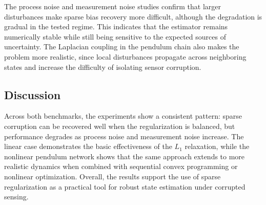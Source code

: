 \documentclass[conference]{IEEEtran}
\begin{document}

The process noise and measurement noise studies confirm that larger disturbances make sparse bias recovery more difficult, although the degradation is gradual in the tested regime. This indicates that the estimator remains numerically stable while still being sensitive to the expected sources of uncertainty. The Laplacian coupling in the pendulum chain also makes the problem more realistic, since local disturbances propagate across neighboring states and increase the difficulty of isolating sensor corruption. \cite{nonlinearModel}



\subsection{Discussion}

Across both benchmarks, the experiments show a consistent pattern: sparse corruption can be recovered well when the regularization is balanced, but performance degrades as process noise and measurement noise increase. The linear case demonstrates the basic effectiveness of the $L_1$ relaxation, while the nonlinear pendulum network shows that the same approach extends to more realistic dynamics when combined with sequential convex programming or nonlinear optimization. Overall, the results support the use of sparse regularization as a practical tool for robust state estimation under corrupted sensing. \cite{linearModel,nonlinearModel}
\end{document}
